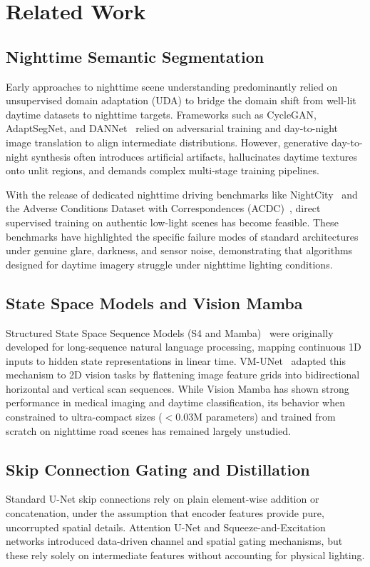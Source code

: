 \documentclass[conference]{IEEEtran}
\begin{document}
\section{Related Work}

\subsection{Nighttime Semantic Segmentation}
Early approaches to nighttime scene understanding predominantly relied on unsupervised domain adaptation (UDA) to bridge the domain shift from well-lit daytime datasets to nighttime targets. Frameworks such as CycleGAN, AdaptSegNet, and DANNet~\cite{wu2021dannet} relied on adversarial training and day-to-night image translation to align intermediate distributions. However, generative day-to-night synthesis often introduces artificial artifacts, hallucinates daytime textures onto unlit regions, and demands complex multi-stage training pipelines.

With the release of dedicated nighttime driving benchmarks like NightCity~\cite{tan2021nightcity} and the Adverse Conditions Dataset with Correspondences (ACDC)~\cite{sakaridis2021acdc}, direct supervised training on authentic low-light scenes has become feasible. These benchmarks have highlighted the specific failure modes of standard architectures under genuine glare, darkness, and sensor noise, demonstrating that algorithms designed for daytime imagery struggle under nighttime lighting conditions.

\subsection{State Space Models and Vision Mamba}
Structured State Space Sequence Models (S4 and Mamba)~\cite{gu2023mamba} were originally developed for long-sequence natural language processing, mapping continuous 1D inputs to hidden state representations in linear time. VM-UNet~\cite{ruan2024vmunet} adapted this mechanism to 2D vision tasks by flattening image feature grids into bidirectional horizontal and vertical scan sequences. While Vision Mamba has shown strong performance in medical imaging and daytime classification, its behavior when constrained to ultra-compact sizes ($<0.03\text{M}$ parameters) and trained from scratch on nighttime road scenes has remained largely unstudied.

\subsection{Skip Connection Gating and Distillation}
Standard U-Net skip connections rely on plain element-wise addition or concatenation, under the assumption that encoder features provide pure, uncorrupted spatial details. Attention U-Net and Squeeze-and-Excitation networks introduced data-driven channel and spatial gating mechanisms, but these rely solely on intermediate features without accounting for physical lighting.
\end{document}
